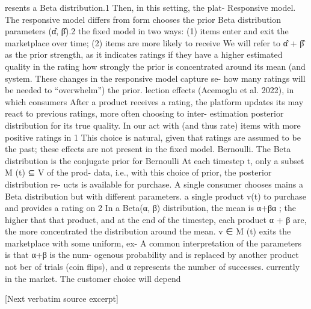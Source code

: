\documentclass[10pt]{article}
\begin{document}
\begin{ReviewVerbatim}
resents a Beta distribution.1 Then, in this setting, the plat-                     Responsive model. The responsive model differs from
form chooses the prior Beta distribution parameters (α̂, β̂).2                  the fixed model in two ways: (1) items enter and exit the
                                                                                marketplace over time; (2) items are more likely to receive
We will refer to α̂ + β̂ as the prior strength, as it indicates                 ratings if they have a higher estimated quality in the rating
how strongly the prior is concentrated around its mean (and                     system. These changes in the responsive model capture se-
how many ratings will be needed to “overwhelm”) the prior.                      lection effects (Acemoglu et al. 2022), in which consumers
   After a product receives a rating, the platform updates its                  may react to previous ratings, more often choosing to inter-
estimation posterior distribution for its true quality. In our                  act with (and thus rate) items with more positive ratings in
    1
      This choice is natural, given that ratings are assumed to be
                                                                                the past; these effects are not present in the fixed model.
Bernoulli. The Beta distribution is the conjugate prior for Bernoulli              At each timestep t, only a subset M (t) ⊆ V of the prod-
data, i.e., with this choice of prior, the posterior distribution re-           ucts is available for purchase. A single consumer chooses
mains a Beta distribution but with different parameters.                        a single product v(t) to purchase and provides a rating on
    2
      In a Beta(α, β) distribution, the mean is α+βα
                                                     ; the higher that          that product, and at the end of the timestep, each product
α + β are, the more concentrated the distribution around the mean.              v ∈ M (t) exits the marketplace with some uniform, ex-
A common interpretation of the parameters is that α+β is the num-               ogenous probability and is replaced by another product not
ber of trials (coin flips), and α represents the number of successes.           currently in the market. The customer choice will depend

[Next verbatim source excerpt]


\end{ReviewVerbatim}
\end{document}
